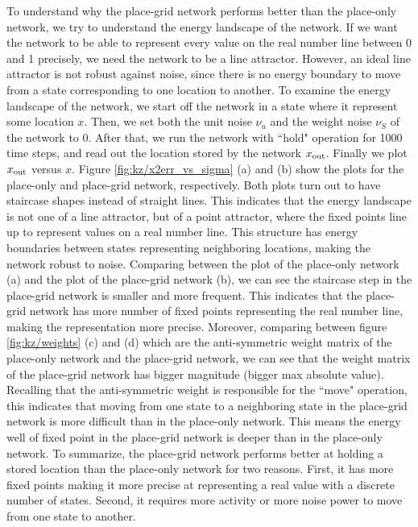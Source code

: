 To understand why the place-grid network performs better than the place-only network, we try to understand the energy landscape of the network. If we want the network to be able to represent every value on the real number line between 0 and 1 precisely, we need the network to be a line attractor. However, an ideal line attractor is not robust against noise, since there is no energy boundary to move from a state corresponding to one location to another. To examine the energy landscape of the network, we start off the network in a state where it represent some location $x$. Then, we set both the unit noise $\nu_u$ and the weight noise $\nu_S$ of the network to 0. After that, we run the network with ``hold" operation for 1000 time steps, and read out the location stored by the network $x_{\scriptsize{\text{out}}}$. Finally we plot $x_{\scriptsize{\text{out}}}$ versus $x$. Figure \ref{fig:kz/x2err_vs_sigma} (a) and (b) show the plots for the place-only and place-grid network, respectively. Both plots turn out to have staircase shapes instead of straight lines. This indicates that the energy landscape is not one of a line attractor, but of a point attractor, where the fixed points line up to represent values on a real number line. This structure has energy boundaries between states representing neighboring locations, making the network robust to noise. Comparing between the plot of the place-only network (a) and the plot of the place-grid network (b), we can see the staircase step in the place-grid network is smaller and more frequent. This indicates that the place-grid network has more number of fixed points representing the real number line, making the representation more precise. Moreover, comparing between figure \ref{fig:kz/weights} (c) and (d) which are the anti-symmetric weight matrix of the place-only network and the place-grid network, we can see that the weight matrix of the place-grid network has bigger magnitude (bigger max absolute value). Recalling that the anti-symmetric weight is responsible for the ``move" operation, this indicates that moving from one state to a neighboring state in the place-grid network is more difficult than in the place-only network. This means the energy well of fixed point in the place-grid network is deeper than in the place-only network. To summarize, the place-grid network performs better at holding a stored location than the place-only network for two reasons. First, it has more fixed points making it more precise at representing a real value with a discrete number of states. Second, it requires more activity or more noise power to move from one state to another.

